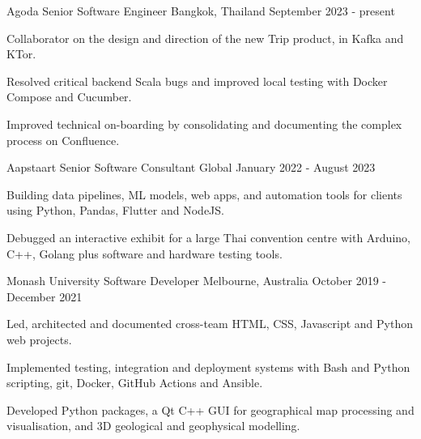 


\begin{cventries}
  \cventry
    {Agoda} %
	{Senior Software Engineer} %
    {Bangkok, Thailand} %
    {September 2023 - present} %
    {
      \begin{cvitems} %
		  \item {
				Collaborator on the design and direction of the new Trip product, in Kafka and KTor.
			  }
		  \item {
				Resolved critical backend Scala bugs and improved local testing with Docker Compose and Cucumber.
			  }
		  \item {
				Improved technical on-boarding by consolidating and documenting the complex process on Confluence.
			  }
      \end{cvitems}
    }

  \cventry
    {Aapstaart} %
	{Senior Software Consultant} %
    {Global} %
    {January 2022 - August 2023} %
    {
      \begin{cvitems} %
		  \item {
			Building data pipelines, ML models, web apps, and automation tools for clients using Python, Pandas, Flutter and NodeJS.
			  }
		  \item {
			Debugged an interactive exhibit for a large Thai convention centre with Arduino, C++, Golang plus software and hardware testing tools.
			  }
      \end{cvitems}
    }


  \cventry
    {Monash University} %
    {Software Developer} %
    {Melbourne, Australia} %
    {October 2019 - December 2021} %
    {
      \begin{cvitems} %
		  \item {
			 Led, architected and documented cross-team HTML, CSS, Javascript and Python web projects. 
			  }
		  \item {
			 Implemented testing, integration and deployment systems with Bash and Python scripting, git, Docker, GitHub Actions and Ansible. 
			  } 
		  \item {
			 Developed Python packages, a Qt C++ GUI for geographical map processing and visualisation, and 3D geological and geophysical modelling. 
			  }
      \end{cvitems}
    }



\end{cventries}
